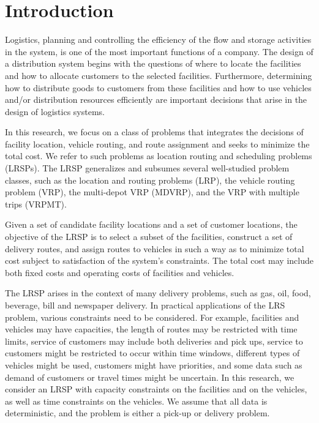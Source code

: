  
\section{Introduction} 

Logistics, planning and controlling the efficiency of the flow
and storage activities in the system, is one of the most important 
functions of a company. The design of a distribution system begins 
with the questions of where to locate the facilities and how to 
allocate customers to the selected facilities. 
Furthermore, determining how to distribute goods to customers from
these facilities and how to use vehicles and/or 
distribution resources efficiently are important
decisions that arise in the design of logistics systems. 

In this research, we focus on a class of problems that integrates
the decisions of facility location, vehicle routing, and route assignment 
and seeks to minimize the total cost. We refer to such problems as location 
routing and scheduling problems (LRSPs). The LRSP generalizes and subsumes 
several well-studied problem classes, such as the location and routing problems 
(LRP), the vehicle routing problem (VRP), the multi-depot VRP (MDVRP), and the 
VRP with multiple trips (VRPMT). 

Given a set of candidate facility locations 
and a set of customer locations, the objective of the LRSP is to select a subset 
of the facilities, construct a set of delivery routes, and assign routes to vehicles 
in such a way as to minimize total cost subject to satisfaction of the system's constraints. 
The total cost may include both fixed costs and operating costs of 
facilities and vehicles. 

The LRSP arises in the context of many delivery problems, 
such as gas, oil, food, beverage, bill and newspaper delivery.
In practical applications of the LRS problem, various constraints need to be considered. 
For example, facilities and vehicles may have capacities, the length of routes may
be restricted with time limits, service of customers may include both deliveries 
and pick ups, service to customers might be restricted to occur within time windows, 
different types of vehicles might be  used, customers might have priorities, and some 
data such as demand of customers or travel times might be uncertain. 
In this research, we consider an LRSP with capacity constraints on the 
facilities and on the vehicles, as well as time constraints on the vehicles. 
We assume that all data is deterministic, and the problem is either a pick-up or 
delivery problem. 


